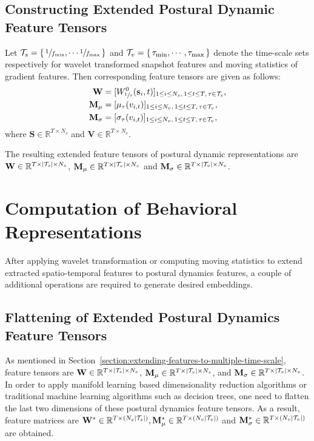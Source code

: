 \subsection{Constructing Extended Postural Dynamic Feature Tensors}
Let $\mathcal{T}_s=\left\{ \, \sfrac{1}{f_{\textnormal{min}}}, \cdots \sfrac{1}{f_{\textnormal{max}}} \, \right\}$ and $\mathcal{T}_v=\left\{ \, \tau_{\textnormal{min}}, \cdots, \tau_{\textnormal{max}} \, \right\}$ denote the time-scale sets respectively for wavelet transformed snapshot features and moving statistics of gradient features. Then corresponding feature tensors are given as follows:
\begin{align}
	\mathbf{W}        & = [W^0_{\sfrac{1}{\tau}}(\mathbf{s}_i, t)]_{1 \leq i \leq N_s, \,1 \leq t \leq T, \, \tau \in \mathcal{T}_s}, \\
	\mathbf{M}_\mu    & = [\mu_\tau(v_{i,t})]_{1 \leq i \leq  N_v,  \, 1\leq t \leq T, \, \tau \in \mathcal{T}_v},                    \\
	\mathbf{M}_\sigma & = [\sigma_\tau(v_{i,t})]_{1 \leq i \leq N_v, \, 1\leq t \leq T, \, \tau \in \mathcal{T}_v},
\end{align}
where $\mathbf{S} \in \mathbb{R}^{T \times N_s}$ and $\mathbf{V} \in \mathbb{R}^{T \times N_v}$.

The resulting extended feature tensors of postural dynamic representations are $\mathbf{W} \in \mathbb{R}^{T \times \lvert\mathcal{T}_s\rvert \times N_s}$, $\mathbf{M}_\mu \in \mathbb{R}^{T \times \lvert\mathcal{T}_v\rvert \times N_v}$ and $\mathbf{M}_\sigma \in \mathbb{R}^{T \times \lvert\mathcal{T}_v\rvert \times N_v}$.
\section{Computation of Behavioral Representations}
After applying wavelet transformation or computing moving statistics to extend extracted spatio-temporal features to postural dynamics features, a couple of additional operations are required to generate desired embeddings.

\subsection{Flattening of Extended Postural Dynamics Feature Tensors}
As mentioned in Section~\ref{section:extending-features-to-multiple-time-scale}, feature tensors are $\mathbf{W} \in \mathbb{R}^{T \times \lvert\mathcal{T}_s\rvert \times N_s}$, $\mathbf{M}_\mu \in \mathbb{R}^{T \times \lvert\mathcal{T}_v\rvert \times N_v}$, and  $\mathbf{M}_\sigma \in \mathbb{R}^{T \times \lvert\mathcal{T}_v\rvert \times N_v}$.
In order to apply manifold learning based dimensionality reduction algorithms or traditional machine learning algorithms such as decision trees, one need to flatten the last two dimensions of these postural dynamics feature tensors.
As a result, feature matrices are $\mathbf{W}^\ast \in \mathbb{R}^{T \times \left( N_s\lvert\mathcal{T}_s\rvert\right)}, \mathbf{M}_\mu^\ast \in \mathbb{R}^{T \times \left( N_v\lvert\mathcal{T}_v\rvert\right)}$ and $\mathbf{M}_\sigma^\ast \in \mathbb{R}^{T \times \left( N_v\lvert\mathcal{T}_v\rvert\right)}$ are obtained.

